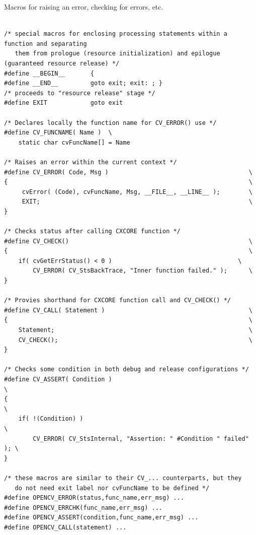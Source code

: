Macros for raising an error, checking for errors, etc.

\begin{lstlisting}

/* special macros for enclosing processing statements within a function and separating
   them from prologue (resource initialization) and epilogue (guaranteed resource release) */
#define __BEGIN__       {
#define __END__         goto exit; exit: ; }
/* proceeds to "resource release" stage */
#define EXIT            goto exit

/* Declares locally the function name for CV_ERROR() use */
#define CV_FUNCNAME( Name )  \
    static char cvFuncName[] = Name

/* Raises an error within the current context */
#define CV_ERROR( Code, Msg )                                       \
{                                                                   \
     cvError( (Code), cvFuncName, Msg, __FILE__, __LINE__ );        \
     EXIT;                                                          \
}

/* Checks status after calling CXCORE function */
#define CV_CHECK()                                                  \
{                                                                   \
    if( cvGetErrStatus() < 0 )                                   \
        CV_ERROR( CV_StsBackTrace, "Inner function failed." );      \
}

/* Provies shorthand for CXCORE function call and CV_CHECK() */
#define CV_CALL( Statement )                                        \
{                                                                   \
    Statement;                                                      \
    CV_CHECK();                                                     \
}

/* Checks some condition in both debug and release configurations */
#define CV_ASSERT( Condition )                                          \
{                                                                       \
    if( !(Condition) )                                                  \
        CV_ERROR( CV_StsInternal, "Assertion: " #Condition " failed" ); \
}

/* these macros are similar to their CV_... counterparts, but they
   do not need exit label nor cvFuncName to be defined */
#define OPENCV_ERROR(status,func_name,err_msg) ...
#define OPENCV_ERRCHK(func_name,err_msg) ...
#define OPENCV_ASSERT(condition,func_name,err_msg) ...
#define OPENCV_CALL(statement) ...

\end{lstlisting}

